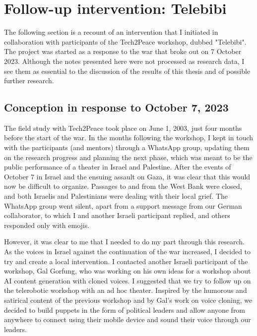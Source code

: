 \documentclass[dissertation,math,vertlayout,pdfa,colorlinks]{aaltoseries}
\begin{document}
\section{Follow-up intervention: Telebibi}
The following section is a recount of an intervention that I initiated in collaboration with participants of the Tech2Peace workshop, dubbed "Telebibi". The project was started as a response to the war that broke out on 7 October 2023. Although the notes presented here were not processed as research data, I see them as essential to the discussion of the results of this thesis and of possible further research.
\subsection{Conception in response to October 7, 2023}
The field study with Tech2Peace took place on June 1, 2003, just four months before the start of the war. In the months following the workshop, I kept in touch with the participants (and mentors) through a WhatsApp group, updating them on the research progress and planning the next phase, which was meant to be the public performance of a theater in Israel and Palestine. After the events of October 7 in Israel and the ensuing assault on Gaza, it was clear that this would now be difficult to organize. Passages to and from the West Bank were closed, and both Israelis and Palestinians were dealing with their local grief. The WhatsApp group went silent, apart from a support message from our German collaborator, to which I and another Israeli participant replied, and others responded only with emojis. 

However, it was clear to me that I needed to do my part through this research. As the voices in Israel against the continuation of the war increased, I decided to try and create a local intervention. I contacted another Israeli participant of the workshop, Gal Gorfung, who was working on his own ideas for a workshop about AI content generation with cloned voices. I suggested that we try to follow up on the telerobotic workshop with an ad hoc theater. Inspired by the humorous and satirical content of the previous workshop and by Gal's work on voice cloning, we decided to build puppets in the form of political leaders and allow anyone from anywhere to connect using their mobile device and sound their voice through our leaders.
\end{document}
